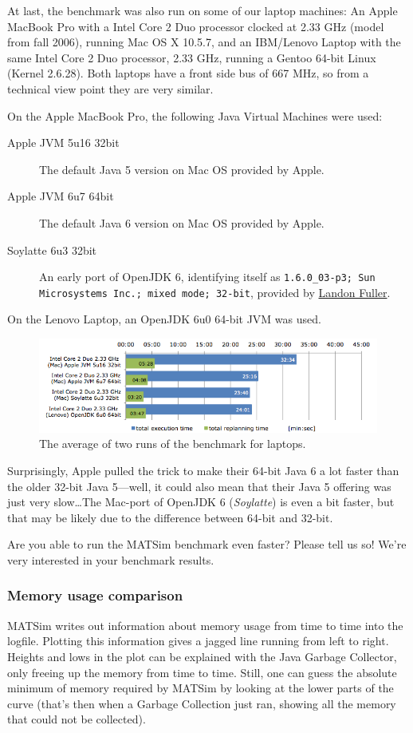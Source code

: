 At last, the benchmark was also run on some of our laptop machines: An Apple MacBook Pro with a Intel Core 2 Duo processor clocked at 2.33 GHz (model from fall 2006), running Mac OS X 10.5.7, and an IBM/Lenovo Laptop with the same Intel Core 2 Duo processor, 2.33 GHz, running a Gentoo 64-bit Linux (Kernel 2.6.28). Both laptops have a front side bus of 667 MHz, so from a technical view point they are very similar.

On the Apple MacBook Pro, the following Java Virtual Machines were used:

\begin{description}
\item[Apple JVM 5u16 32bit]\quad The default Java 5 version on Mac OS provided by Apple.
\item[Apple JVM 6u7 64bit]\quad The default Java 6 version on Mac OS provided by Apple.
\item[Soylatte 6u3 32bit]\quad An early port of OpenJDK 6, identifying itself as \texttt{1.6.0\_03-p3; Sun Microsystems Inc.; mixed mode; 32-bit}, provided by \href{http://landonf.bikemonkey.org/static/soylatte/}{Landon Fuller}.
\end{description}
On the Lenovo Laptop, an OpenJDK 6u0 64-bit JVM was used.
\begin{figure}[h]
\centering
\includegraphics[width=0.75\linewidth]{figures/benchmarks/benchmark3}
\caption{The average of two runs of the benchmark for laptops.}
\label{fig:Benchmark03}
\end{figure}
Surprisingly, Apple pulled the trick to make their 64-bit Java 6 a lot faster than the older 32-bit Java 5—well, it could also mean that their Java 5 offering was just very slow\ldots The Mac-port of OpenJDK 6 (\emph{Soylatte}) is even a bit faster, but that may be likely due to the difference between 64-bit and 32-bit.

Are you able to run the MATSim benchmark even faster? Please tell us so! We're very interested in your benchmark results.

\subsubsection{Memory usage comparison}
MATSim writes out information about memory usage from time to time into the logfile. Plotting this information gives a jagged line running from left to right. Heights and lows in the plot can be explained with the Java Garbage Collector, only freeing up the memory from time to time. Still, one can guess the absolute minimum of memory required by MATSim by looking at the lower parts of the curve (that's then when a Garbage Collection just ran, showing all the memory that could not be collected).

